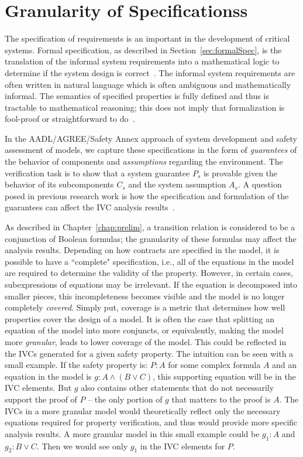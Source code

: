 \chapter{Granularity of Specificationss}
\label{chap:granularity}
The specification of requirements is an important in the development of critical systems. Formal specification, as described in Section~\ref{sec:formalSpec}, is the translation of the informal system requirements into a mathematical logic to determine if the system design is correct~\cite{hinchey2012industrial}. The informal system requirements are often written in natural language which is often ambiguous and mathematically informal. The semantics of specified properties is fully defined and thus is tractable to mathematical reasoning; this does not imply that formalization is fool-proof or straightforward to do~\cite{kotonya1998requirements}. 

 In the AADL/AGREE/Safety Annex approach of system development and safety assessment of models, we capture these specifications in the form of \emph{guarantees} of the behavior of components and \emph{assumptions} regarding the environment. The verification task is to show that a system guarantee $P_s$ is provable given the behavior of its subcomponents $C_s$ and the system assumption $A_s$. A question posed in previous research work is how the specification and formulation of the guarantees can affect the IVC analysis results~\cite{ghassabani_2018}. 

As described in Chapter~\ref{chap:prelim}, a transition relation is considered to be a conjunction of Boolean formulas; the granularity of these formulas may affect the analysis results. Depending on how contracts are specified in the model, it is possible to have a ``complete" specification, i.e., all of the equations in the model are required to determine the validity of the property. However, in certain cases, subexpressions of equations may be irrelevant. If the equation is decomposed into smaller pieces, this incompleteness becomes visible and the model is no longer completely {\em covered}. Simply put, coverage is a metric that determines how well properties cover the design of a model. It is often the case that splitting an equation of the model into more conjuncts, or equivalently, making the model more \textit{granular}, leads to lower coverage of the model. This could be reflected in the IVCs generated for a given safety property. The intuition can be seen with a small example. If the safety property is: $P : A $ for some complex formula $A$ and an equation in the model is $g: A \land (B \lor C)$, this supporting equation will be in the IVC elements. But $g$ also contains other statements that do not necessarily support the proof of $P$ -- the only portion of $g$ that matters to the proof is $A$. The IVCs in a more granular model would theoretically reflect only the necessary equations required for property verification, and thus would provide more specific analysis results. A more granular model in this small example could be $g_1 : A$ and $g_2: B \lor C$. Then we would see only $g_1$ in the IVC elements for $P$. 


